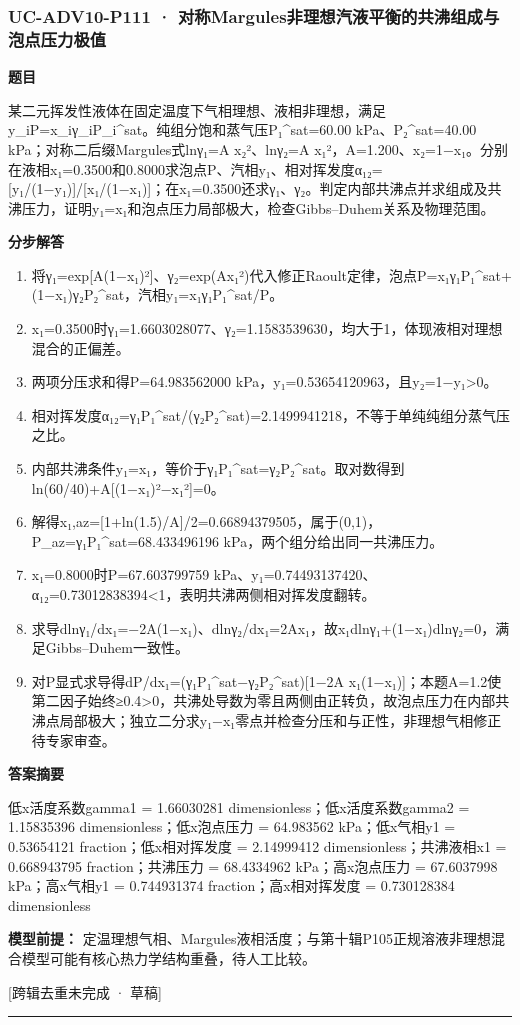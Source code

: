 \documentclass[UTF8,11pt,a4paper]{ctexart}
\begin{document}
\subsubsection*{UC-ADV10-P111 · 对称Margules非理想汽液平衡的共沸组成与泡点压力极值}
\noindent\textbf{题目}\par
某二元挥发性液体在固定温度下气相理想、液相非理想，满足y\_iP=x\_iγ\_iP\_i\textasciicircum{}sat。纯组分饱和蒸气压P₁\textasciicircum{}sat=60.00 kPa、P₂\textasciicircum{}sat=40.00 kPa；对称二后缀Margules式lnγ₁=A x₂²、lnγ₂=A x₁²，A=1.200、x₂=1−x₁。分别在液相x₁=0.3500和0.8000求泡点P、汽相y₁、相对挥发度α₁₂=[y₁/(1−y₁)]/[x₁/(1−x₁)]；在x₁=0.3500还求γ₁、γ₂。判定内部共沸点并求组成及共沸压力，证明y₁=x₁和泡点压力局部极大，检查Gibbs–Duhem关系及物理范围。\par
\medskip\noindent\textbf{分步解答}
\begin{enumerate}
\item 将γ₁=exp[A(1−x₁)²]、γ₂=exp(Ax₁²)代入修正Raoult定律，泡点P=x₁γ₁P₁\textasciicircum{}sat+(1−x₁)γ₂P₂\textasciicircum{}sat，汽相y₁=x₁γ₁P₁\textasciicircum{}sat/P。
\item x₁=0.3500时γ₁=1.6603028077、γ₂=1.1583539630，均大于1，体现液相对理想混合的正偏差。
\item 两项分压求和得P=64.983562000 kPa，y₁=0.53654120963，且y₂=1−y₁>0。
\item 相对挥发度α₁₂=γ₁P₁\textasciicircum{}sat/(γ₂P₂\textasciicircum{}sat)=2.1499941218，不等于单纯纯组分蒸气压之比。
\item 内部共沸条件y₁=x₁，等价于γ₁P₁\textasciicircum{}sat=γ₂P₂\textasciicircum{}sat。取对数得到ln(60/40)+A[(1−x₁)²−x₁²]=0。
\item 解得x₁,az=[1+ln(1.5)/A]/2=0.66894379505，属于(0,1)，P\_az=γ₁P₁\textasciicircum{}sat=68.433496196 kPa，两个组分给出同一共沸压力。
\item x₁=0.8000时P=67.603799759 kPa、y₁=0.74493137420、α₁₂=0.73012838394<1，表明共沸两侧相对挥发度翻转。
\item 求导dlnγ₁/dx₁=−2A(1−x₁)、dlnγ₂/dx₁=2Ax₁，故x₁dlnγ₁+(1−x₁)dlnγ₂=0，满足Gibbs–Duhem一致性。
\item 对P显式求导得dP/dx₁=(γ₁P₁\textasciicircum{}sat−γ₂P₂\textasciicircum{}sat)[1−2A x₁(1−x₁)]；本题A=1.2使第二因子始终≥0.4>0，共沸处导数为零且两侧由正转负，故泡点压力在内部共沸点局部极大；独立二分求y₁−x₁零点并检查分压和与正性，非理想气相修正待专家审查。
\end{enumerate}
\noindent\textbf{答案摘要}\par
低x活度系数gamma1 = 1.66030281 dimensionless；低x活度系数gamma2 = 1.15835396 dimensionless；低x泡点压力 = 64.983562 kPa；低x气相y1 = 0.53654121 fraction；低x相对挥发度 = 2.14999412 dimensionless；共沸液相x1 = 0.668943795 fraction；共沸压力 = 68.4334962 kPa；高x泡点压力 = 67.6037998 kPa；高x气相y1 = 0.744931374 fraction；高x相对挥发度 = 0.730128384 dimensionless\par
\noindent\textbf{模型前提：}
定温理想气相、Margules液相活度；与第十辑P105正规溶液非理想混合模型可能有核心热力学结构重叠，待人工比较。\par
\noindent\textcolor{red!65!black}{[跨辑去重未完成 · 草稿]} \par
\medskip\hrule\medskip
{}
\end{document}
